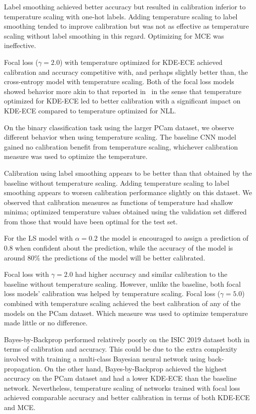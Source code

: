 Label smoothing achieved better accuracy but resulted in calibration inferior to temperature scaling with one-hot labels. Adding temperature scaling to label smoothing tended to improve calibration but was not as effective as temperature scaling without label smoothing in this regard. Optimizing for MCE was ineffective. 

Focal loss ($\gamma = 2.0$) with temperature optimized for KDE-ECE achieved calibration and accuracy competitive with, and perhaps slightly better than, the cross-entropy model with temperature scaling. Both of the focal loss models showed behavior more akin to that reported in~\cite{mukhoti2020calibrating} in the sense that temperature optimized for KDE-ECE led to better calibration with a significant impact on KDE-ECE compared to temperature optimized for NLL.

On the binary classification task using the larger PCam dataset, we observe different behavior when using temperature scaling. The baseline CNN model gained no calibration benefit from temperature scaling, whichever calibration measure was used to optimize the temperature. 

Calibration using label smoothing appears to be better than that obtained by the baseline without temperature scaling. Adding temperature scaling to label smoothing appears to worsen calibration performance slightly on this dataset. We observed that calibration measures as functions of temperature had shallow minima; optimized temperature values obtained using the validation set differed from those that would have been optimal for the test set. 

For the LS model with $\alpha=0.2$ the model is encouraged to assign a prediction of 0.8 when confident about the prediction, while the accuracy of the model is around 80\% the predictions of the model will be better calibrated. 

Focal loss with $\gamma = 2.0$ had higher accuracy and similar calibration to the baseline without temperature scaling. However, unlike the baseline, both focal loss models' calibration was helped by temperature scaling. Focal loss ($\gamma = 5.0$) combined with temperature scaling achieved the best calibration of any of the models on the PCam dataset. Which measure was used to optimize temperature made little or no difference.

Bayes-by-Backprop performed relatively poorly on the ISIC 2019 dataset both in terms of calibration and accuracy. This could be due to the extra complexity involved with training a multi-class Bayesian neural network using back-propagation. On the other hand, Bayes-by-Backprop achieved the highest accuracy on the PCam dataset and had a lower KDE-ECE than the baseline network. Nevertheless, temperature scaling of networks trained with focal loss achieved comparable accuracy and better calibration in terms of both KDE-ECE and MCE. 

